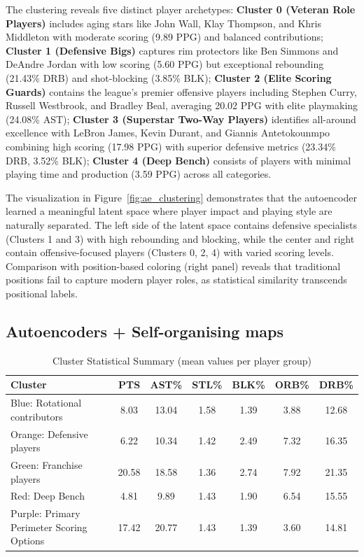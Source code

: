 \documentclass{article}
\begin{document}
The clustering reveals five distinct player archetypes: {\bf Cluster 0 (Veteran Role Players)} includes aging stars like John Wall, Klay Thompson, and Khris Middleton with moderate scoring (9.89 PPG) and balanced contributions; {\bf Cluster 1 (Defensive Bigs)} captures rim protectors like Ben Simmons and DeAndre Jordan with low scoring (5.60 PPG) but exceptional rebounding (21.43\% DRB) and shot-blocking (3.85\% BLK); {\bf Cluster 2 (Elite Scoring Guards)} contains the league's premier offensive players including Stephen Curry, Russell Westbrook, and Bradley Beal, averaging 20.02 PPG with elite playmaking (24.08\% AST); {\bf Cluster 3 (Superstar Two-Way Players)} identifies all-around excellence with LeBron James, Kevin Durant, and Giannis Antetokounmpo combining high scoring (17.98 PPG) with superior defensive metrics (23.34\% DRB, 3.52\% BLK); {\bf Cluster 4 (Deep Bench)} consists of players with minimal playing time and production (3.59 PPG) across all categories.

The visualization in Figure~\ref{fig:ae_clustering} demonstrates that the autoencoder learned a meaningful latent space where player impact and playing style are naturally separated. The left side of the latent space contains defensive specialists (Clusters 1 and 3) with high rebounding and blocking, while the center and right contain offensive-focused players (Clusters 0, 2, 4) with varied scoring levels. Comparison with position-based coloring (right panel) reveals that traditional positions fail to capture modern player roles, as statistical similarity transcends positional labels.

\subsection{Autoencoders + Self-organising maps}

\begin{table}[h!]
\centering
\caption{Cluster Statistical Summary (mean values per player group)}
\label{tab:cluster_stats}
\begin{tabular}{lcccccc}
\toprule
\textbf{Cluster} & \textbf{PTS} & \textbf{AST\%} & \textbf{STL\%} & \textbf{BLK\%} & \textbf{ORB\%} & \textbf{DRB\%} \\
\midrule
Blue: Rotational contributors & 8.03 & 13.04 & 1.58 & 1.39 & 3.88 &	12.68 \\
Orange: Defensive players & 6.22 & 10.34 & 1.42 & 2.49 & 7.32 & 16.35 \\
Green: Franchise players & 20.58 & 18.58 & 1.36 & 2.74 & 7.92 & 21.35 \\
Red: Deep Bench & 4.81	& 9.89 &	1.43 &	1.90 &	6.54 &	15.55 \\
Purple: Primary Perimeter Scoring Options & 17.42	&20.77 &	1.43 &	1.39	& 3.60	& 14.81 \\
\bottomrule
\end{tabular}
\end{table}
\end{document}
